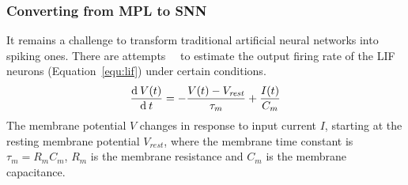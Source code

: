 \subsubsection{Converting from MPL to SNN}
It remains a challenge to transform traditional artificial neural networks into spiking ones.
There are attempts~\cite{la2008response}~\cite{burkitt2006review} to estimate the output firing rate of the LIF neurons (Equation~\ref{equ:lif}) under certain conditions. 
\begin{equation}
\frac{\mathrm{d} \: V(t)}{\mathrm{d}\:  t}=-\frac{V(t)-V_\mathit{rest}}{\tau_m}+\frac{I(t)}{C_m}
\label{equ:lif}
\end{equation}
The membrane potential $V$ changes in response to input current $I$, starting at the resting membrane potential  $V_{rest}$, where the membrane time constant is $\tau_m = R_mC_m$, $R_m$ is the membrane resistance and $C_m$ is the membrane capacitance.

